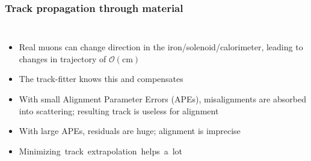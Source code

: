 \documentclass[compress]{beamer}
\begin{document}
\begin{frame}
\frametitle{Track propagation through material}
\begin{columns}
\begin{itemize}\setlength{\itemsep}{0.25 cm}
\item Real muons can change direction in the
iron/solenoid/calorimeter, leading to changes in trajectory of
$\mathcal{O}(\mbox{cm})$
\item The track-fitter knows this and compensates
\item With small Alignment Parameter Errors (APEs), misalignments are
absorbed into scattering; resulting track is useless for alignment
\item With large APEs, residuals are huge; alignment is imprecise
\item \mbox{Minimizing track extrapolation helps a lot \hspace{-1 cm}}
\end{itemize}

\end{columns}
\end{frame}
\end{document}
